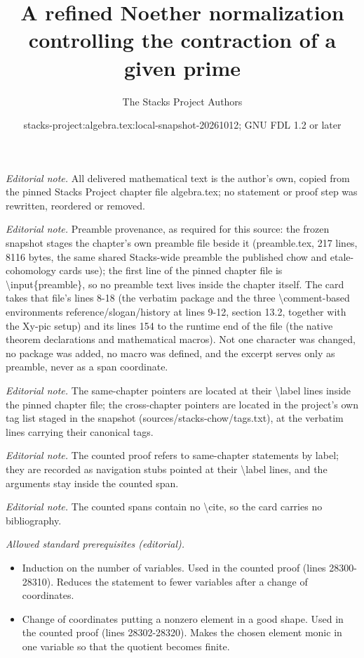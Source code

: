 \documentclass[10pt,a4paper]{amsart}
\title{A refined Noether normalization controlling the contraction of a given prime}
\author{The Stacks Project Authors}
\date{stacks-project:algebra.tex:local-snapshot-20261012; GNU FDL 1.2 or later}
\theoremstyle{plain}
\theoremstyle{definition}
\theoremstyle{remark}
\numberwithin{equation}{subsection}
\begin{document}
\maketitle
\noindent\textit{Editorial note.} All delivered mathematical text is the author's own, copied from the pinned Stacks Project chapter file algebra.tex; no statement or proof step was rewritten, reordered or removed.\par\medskip
\noindent\textit{Editorial note.} Preamble provenance, as required for this source: the frozen snapshot stages the chapter's own preamble file beside it (preamble.tex, 217 lines, 8116 bytes, the same shared Stacks-wide preamble the published chow and etale-cohomology cards use); the first line of the pinned chapter file is \textbackslash{}input\{preamble\}, so no preamble text lives inside the chapter itself. The card takes that file's lines 8-18 (the verbatim package and the three \textbackslash{}comment-based environments reference/slogan/history at lines 9-12, section 13.2, together with the Xy-pic setup) and its lines 154 to the runtime end of the file (the native theorem declarations and mathematical macros). Not one character was changed, no package was added, no macro was defined, and the excerpt serves only as preamble, never as a span coordinate.\par\medskip
\noindent\textit{Editorial note.} The same-chapter pointers are located at their \textbackslash{}label lines inside the pinned chapter file; the cross-chapter pointers are located in the project's own tag list staged in the snapshot (sources/stacks-chow/tags.txt), at the verbatim lines carrying their canonical tags.\par\medskip
\noindent\textit{Editorial note.} The counted proof refers to same-chapter statements by label; they are recorded as navigation stubs pointed at their \textbackslash{}label lines, and the arguments stay inside the counted span.\par\medskip
\noindent\textit{Editorial note.} The counted spans contain no \textbackslash{}cite, so the card carries no bibliography.\par\medskip
\noindent\textit{Allowed standard prerequisites (editorial).}\begin{itemize}
\item Induction on the number of variables. Used in the counted proof (lines 28300-28310). Reduces the statement to fewer variables after a change of coordinates.
\item Change of coordinates putting a nonzero element in a good shape. Used in the counted proof (lines 28302-28320). Makes the chosen element monic in one variable so that the quotient becomes finite.
\end{itemize}\medskip
\end{document}
